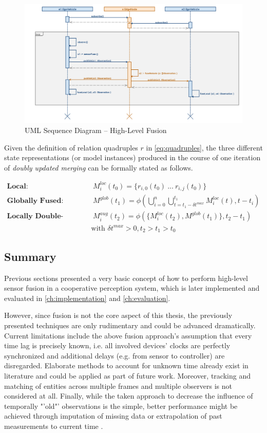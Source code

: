 \begin{figure}[H]
	\centering
	\includegraphics[width=1\linewidth]{98_images/sequence}
	\caption{UML Sequence Diagram – High-Level Fusion}
	\label{fig:sequence}
\end{figure}

Given the definition of relation quadruples $r$ in \autoref{eq:quadruples}, the three different state representations (or model instances) produced in the course of one iteration of \textit{doubly updated merging} can be formally stated as follows.

\begin{align}
	\textbf{Local:\ } &\  M^{loc}_i(t_0) = \{ r_{i,0}(t_0)\ ...\ r_{i,j}(t_0)\} \\
	\textbf{Globally Fused:\ } &\  M^{glob}(t_1) = \phi(\bigcup^n_{i = 0} \bigcup^{t_1}_{t = t_1 - \delta t^{max}} M^{loc}_i(t), t-t_i) \\
	\textbf{Locally Double-Fused:\ } &\  M^{aug}_i(t_2) = \phi(\{ M^{loc}_i(t_2), M^{glob}(t_1) \}, t_2 - t_1)
\end{align}
\begin{gather*}
	\text{with\ } \delta t^{max} > 0, t_2 > t_1 > t_0
\end{gather*}

\subsection{Summary}
\label{subsec:concept_design:fusion_summary}
Previous sections presented a very basic concept of how to perform high-level sensor fusion in a cooperative perception system, which is later implemented and evaluated in \autoref{ch:implementation} and \autoref{ch:evaluation}. 

However, since fusion is not the core aspect of this thesis, the previously presented techniques are only rudimentary and could be advanced dramatically. Current limitations include the above fusion approach's assumption that every time lag is precisely known, i.e. all involved devices' clocks are perfectly synchronized and additional delays (e.g. from sensor to controller) are disregarded. Elaborate methods to account for unknown time already exist in literature \cite{Julier} and could be applied as part of future work. Moreover, tracking and matching of entities across multiple frames and multiple observers is not considered at all. Finally, while the taken approach to decrease the influence of temporally "'old"' observations is the simple, better performance might be achieved through imputation of missing data or extrapolation of past measurements to current time \cite{Chen2019}. 